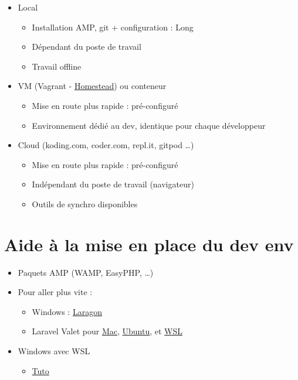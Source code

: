 \begin{itemize}
\tightlist
\item
  Local

  \begin{itemize}
  \tightlist
  \item
    Installation AMP, git + configuration : Long
  \item
    Dépendant du poste de travail
  \item
    Travail offline
  \end{itemize}
\item
  VM (Vagrant -
  \href{https://laravel.com/docs/master/homestead}{Homestead}) ou
  conteneur

  \begin{itemize}
  \tightlist
  \item
    Mise en route plus rapide : pré-configuré
  \item
    Environnement dédié au dev, identique pour chaque développeur
  \end{itemize}
\item
  Cloud (koding.com, coder.com, repl.it, gitpod \ldots)

  \begin{itemize}
  \tightlist
  \item
    Mise en route plus rapide : pré-configuré
  \item
    Indépendant du poste de travail (navigateur)
  \item
    Outils de synchro disponibles
  \end{itemize}
\end{itemize}

\hypertarget{aide-uxe0-la-mise-en-place-du-dev-env}{%
\section{Aide à la mise en place du dev
env}\label{aide-uxe0-la-mise-en-place-du-dev-env}}

\begin{itemize}
\tightlist
\item
  Paquets AMP (WAMP, EasyPHP, \ldots)
\item
  Pour aller plus vite :

  \begin{itemize}
  \tightlist
  \item
    Windows : \href{https://laragon.org/}{Laragon}
  \item
    Laravel Valet pour
    \href{https://laravel.com/docs/master/valet}{Mac},
    \href{https://cpriego.github.io/valet-linux/\#installation}{Ubuntu},
    et \href{https://github.com/valeryan/valet-wsl}{WSL}
  \end{itemize}
\item
  Windows avec WSL

  \begin{itemize}
  \tightlist
  \item
    \href{https://jackwhiting.co.uk/posts/setting-up-a-windows-10-development-environment-with-wsl-php-laravel/}{Tuto}
  \end{itemize}
\end{itemize}

